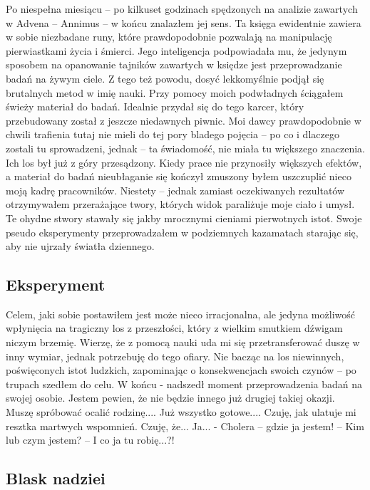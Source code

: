 \documentclass[12pt,a4paper]{report}
\begin{document}
 
Po niespełna miesiącu – po kilkuset godzinach spędzonych na analizie zawartych w Advena – Annimus – w końcu znalazłem jej sens. Ta księga ewidentnie zawiera w sobie niezbadane runy, które prawdopodobnie pozwalają na manipulację pierwiastkami życia i śmierci. Jego inteligencja podpowiadała mu, że jedynym sposobem na opanowanie tajników zawartych w księdze jest przeprowadzanie badań na żywym ciele. Z tego też powodu, dosyć lekkomyślnie podjął się brutalnych metod w imię nauki. Przy pomocy moich podwładnych ściągałem świeży materiał do badań. Idealnie przydał się do tego karcer, który przebudowany został z jeszcze niedawnych piwnic.  Moi dawcy prawdopodobnie w chwili trafienia tutaj nie mieli do tej pory bladego pojęcia – po co i dlaczego zostali tu sprowadzeni, jednak – ta świadomość, nie miała tu większego znaczenia. Ich los był już z góry przesądzony. Kiedy prace nie przynosiły większych efektów, a materiał do badań nieubłaganie się kończył zmuszony byłem uszczuplić nieco moją kadrę pracowników. Niestety – jednak zamiast oczekiwanych rezultatów otrzymywałem przerażające twory, których widok paraliżuje moje ciało i umysł. Te ohydne stwory stawały się jakby mrocznymi cieniami pierwotnych istot. Swoje pseudo eksperymenty przeprowadzałem w podziemnych kazamatach starając się, aby nie ujrzały światła dziennego.
 
\subsection{Eksperyment}
 
Celem, jaki sobie postawiłem jest może nieco irracjonalna, ale jedyna możliwość wpłynięcia na tragiczny los z przeszłości, który z wielkim smutkiem dźwigam niczym brzemię. Wierzę, że z pomocą nauki uda mi się przetransferować duszę w inny wymiar, jednak potrzebuję do tego ofiary.  Nie bacząc na los niewinnych, poświęconych istot ludzkich, zapominając o konsekwencjach swoich czynów – po trupach szedłem do celu. W końcu - nadszedł moment przeprowadzenia badań na swojej osobie. Jestem pewien, że nie będzie innego już drugiej takiej okazji. Muszę spróbować ocalić rodzinę.... Już wszystko gotowe.... Czuję, jak ulatuje mi resztka martwych wspomnień. Czuję, że... Ja... - Cholera – gdzie ja jestem! – Kim lub czym jestem? – I co ja tu robię...?!
 
\subsection{Blask nadziei}
\end{document}
